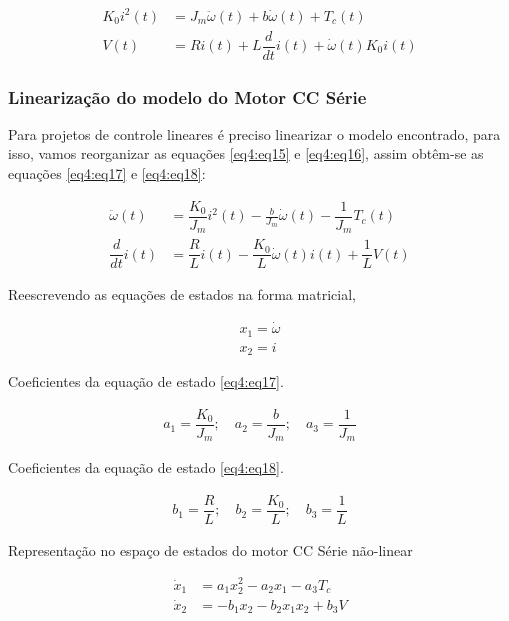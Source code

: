 \begin{align}
	K_0 i^2(t) &= J_m\ddot{\omega}(t) + b\dot{\omega}(t) + T_c(t) \label{eq4:eq15}\\
	V(t) &= Ri(t)+ L\dfrac{d}{dt}i(t) + \dot{\omega}(t)K_0 i(t) \label{eq4:eq16}
\end{align}

\vspace{1cm}

\subsubsection{Linearização do modelo do Motor CC Série}

Para projetos de controle lineares é preciso linearizar o modelo encontrado, para isso, vamos reorganizar as equações \ref{eq4:eq15} e \ref{eq4:eq16}, assim obtêm-se as equações \ref{eq4:eq17} e \ref{eq4:eq18}:

\begin{align}
    \ddot{\omega}(t) &= \dfrac{K_0}{J_m} i^2(t) - \frac{b}{J_m}\dot{\omega}(t) - \dfrac{1}{J_m}T_c(t) \label{eq4:eq17}\\
    \dfrac{d}{dt}i(t) &= \dfrac{R}{L}i(t)- \dfrac{K_0}{L}\dot{\omega}(t)i(t) +\dfrac{1}{L}V(t) \label{eq4:eq18}
\end{align}

Reescrevendo as equações de estados na forma matricial,

\begin{align}
    x_1 = \dot{\omega}  \label{eq4:eq19}\\
    x_2 = i   \label{eq4:eq20}
\end{align}


Coeficientes da equação de estado \ref{eq4:eq17}.

\begin{align}
    a_1 = \dfrac{K_0}{J_m}; \quad a_2 = \dfrac{b}{J_m}; \quad a_3 = \dfrac{1}{J_m}  \label{eq4:eq21}
\end{align}

Coeficientes da equação de estado \ref{eq4:eq18}.

\begin{align}
    b_1 = \dfrac{R}{L}; \quad b_2 = \dfrac{K_0}{L}; \quad b_3 = \dfrac{1}{L}  \label{eq4:eq22}
\end{align}

Representação no espaço de estados do motor CC Série não-linear

\begin{align}
    \dot{x}_1 &= a_1x_2^2  - a_2x_1 -a_3T_c   \label{eq4:eq23}\\
    \dot{x}_2 &= -b_1x_2  -b_2x_1x_2 + b_3V    \label{eq4:eq24}
\end{align}



